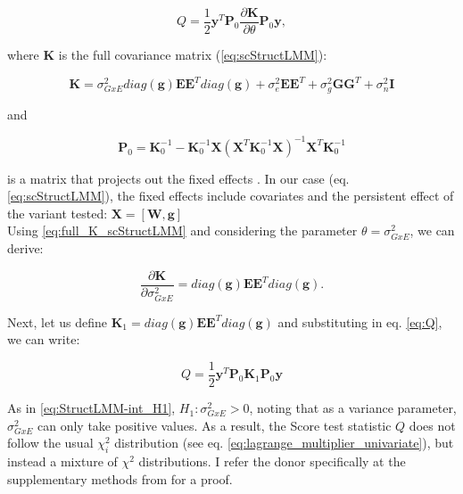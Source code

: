 \begin{equation}\label{eq:Q}
    Q = \frac{1}{2}\mathbf{y}^T\mathbf{P}_0 \frac{\partial \mathbf{K}}{\partial \theta}\mathbf{P}_0 \mathbf{y}, 
\end{equation}

where $\mathbf{K}$ is the full covariance matrix (\eqref{eq:scStructLMM}):

\begin{equation}\label{eq:full_K_scStructLMM}
    \mathbf{K} = \sigma_{GxE}^2diag(\mathbf{g})\mathbf{E}\mathbf{E}^Tdiag(\mathbf{g}) +  \sigma_e^2 \mathbf{E}\mathbf{E}^T + \sigma_g^2 \mathbf{G}\mathbf{G}^T+ \sigma_n^2 \mathbf{I}
\end{equation}

and 

\begin{equation}
    \mathbf{P}_0 = \mathbf{K}_0^{-1}-\mathbf{K}_0^{-1}\mathbf{X}(\mathbf{X}^T\mathbf{K}_0^{-1}\mathbf{X})^{-1}\mathbf{X}^T\mathbf{K}_0^{-1}
\end{equation}

is a matrix that projects out the fixed effects \cite{lippert2011fast, lippert2014greater}.
In our case (eq. \eqref{eq:scStructLMM}), the fixed effects include covariates and the persistent effect of the variant tested: $\mathbf{X} = [\mathbf{W}, \mathbf{g}]$\\

Using \eqref{eq:full_K_scStructLMM} and considering the parameter $\theta = \sigma_{GxE}^2$, we can derive:

\begin{equation}
    \frac{\partial \mathbf{K}}{\partial \sigma_{GxE}^2} = diag(\mathbf{g})\mathbf{E}\mathbf{E}^Tdiag(\mathbf{g}).
\end{equation}

Next, let us define $\mathbf{K}_1 = diag(\mathbf{g})\mathbf{E}\mathbf{E}^Tdiag(\mathbf{g})$
and substituting in eq. \eqref{eq:Q}, we can write:

\begin{equation}
    Q = \frac{1}{2}\mathbf{y}^T\mathbf{P}_0 \mathbf{K}_1\mathbf{P}_0 \mathbf{y} 
\end{equation}

As in \eqref{eq:StructLMM-int_H1}, $H_1: \sigma_{GxE}^2>0$, noting that as a variance parameter, $\sigma_{GxE}^2$ can only take positive values.
As a result, the Score test statistic $Q$ does not follow the usual $\chi^2_i$ distribution (see eq. \eqref{eq:lagrange_multiplier_univariate}), but instead a mixture of  $\chi^2$ distributions.
I refer the donor specifically at the supplementary methods from \cite{lippert2014greater} for a proof.

